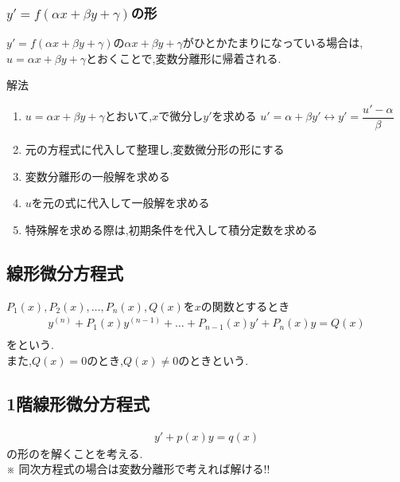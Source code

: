 \documentclass[a4paper]{jsarticle}
\begin{document}
\subsubsection{$y'=f\left(\alpha x+\beta y+\gamma\right)$の形}
$y'=f\left(\alpha x+\beta y+\gamma\right)$の$\alpha x+\beta y+\gamma$がひとかたまりになっている場合は,
$u=\alpha x+\beta y+\gamma$とおくことで,変数分離形に帰着される.
\begin{itembox}[l]{解法}
    \begin{enumerate}[(1)]
        \item $u=\alpha x+\beta y+\gamma$とおいて,$x$で微分し$y'$を求める
              \quad$u'=\alpha+\beta y'\leftrightarrow y'=\dfrac{u'-\alpha}{\beta}$
        \item 元の方程式に代入して整理し,変数微分形の形にする
        \item 変数分離形の一般解を求める
        \item $u$を元の式に代入して一般解を求める
        \item 特殊解を求める際は,初期条件を代入して積分定数を求める
    \end{enumerate}
\end{itembox}
\subsection{線形微分方程式}
$P_1\left(x\right),P_2\left(x\right),\dots,P_n\left(x\right),Q\left(x\right)$を$x$の関数とするとき\\
\begin{eqnarray*}
    y^{\left(n\right)}+P_1\left(x\right)y^{\left(n-1\right)}+\dots+P_{n-1}\left(x\right)y'+P_n\left(x\right)y=Q\left(x\right)\\
\end{eqnarray*}
をという.\\
また,$Q\left(x\right)=0$のとき,$Q\left(x\right)\neq0$のときという.
\subsection{1階線形微分方程式}
\begin{eqnarray*}
    y'+p\left(x\right)y=q\left(x\right)
\end{eqnarray*}
の形のを解くことを考える.\\
※ 同次方程式の場合は変数分離形で考えれば解ける!!
\end{document}
